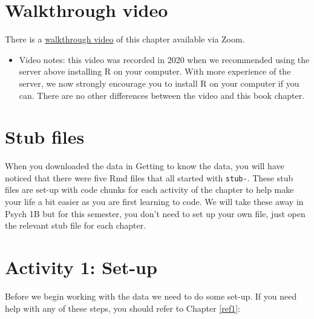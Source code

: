 \documentclass[
  oneside]{book}
\providecommand{\tightlist}{%
  \setlength{\itemsep}{0pt}\setlength{\parskip}{0pt}}
\begin{document}
\hypertarget{walkthrough-video-1}{%
\section{Walkthrough video}\label{walkthrough-video-1}}

There is a \href{https://uofglasgow.zoom.us/rec/play/teIkYYMpGx6UZyRmnp6oFP9a0oR1pkAdyKDtrOS19PMrPzWFD6UM8kf1JPOA8BUCvdTjDD1TL0BY7fst.UJ5avFdQMYGeSE-b?startTime=1600350969000\&_x_zm_rtaid=tV6tnLfOQS6SzFo0htAAPg.1600855466001.bb934ef09570772957442af0f1cfb9b5\&_x_zm_rhtaid=682}{walkthrough video} of this chapter available via Zoom.

\begin{itemize}
\tightlist
\item
  Video notes: this video was recorded in 2020 when we recommended using the server above installing R on your computer. With more experience of the server, we now strongly encourage you to install R on your computer if you can. There are no other differences between the video and this book chapter.
\end{itemize}

\hypertarget{stub-files}{%
\section{Stub files}\label{stub-files}}

When you downloaded the data in Getting to know the data, you will have noticed that there were five Rmd files that all started with \texttt{stub-}. These stub files are set-up with code chunks for each activity of the chapter to help make your life a bit easier as you are first learning to code. We will take these away in Psych 1B but for this semester, you don't need to set up your own file, just open the relevant stub file for each chapter.

\hypertarget{activity-1-set-up}{%
\section{Activity 1: Set-up}\label{activity-1-set-up}}

Before we begin working with the data we need to do some set-up. If you need help with any of these steps, you should refer to Chapter \ref{ref1}:
\end{document}

